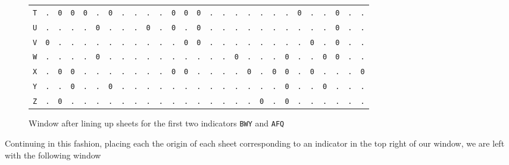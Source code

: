 \begin{figure}[H]
\begin{center}
{\begin{tabular}{c|cccccccccccccccccccccccccc}
				\texttt{T} & \texttt{.} & \texttt{0} & \texttt{0} & \texttt{0} & \texttt{.} & \texttt{0} & \texttt{.} & \texttt{.} & \texttt{.} & \texttt{.} & \texttt{0} & \texttt{0} & \texttt{0} & \texttt{.} & \texttt{.} & \texttt{.} & \texttt{.} & \texttt{.} & \texttt{.} & \texttt{.} & \texttt{0} & \texttt{.} & \texttt{.} & \texttt{0} & \texttt{.} & \texttt{.} \\
				\texttt{U} & \texttt{.} & \texttt{.} & \texttt{.} & \texttt{.} & \texttt{0} & \texttt{.} & \texttt{.} & \texttt{.} & \texttt{0} & \texttt{.} & \texttt{0} & \texttt{.} & \texttt{0} & \texttt{.} & \texttt{.} & \texttt{.} & \texttt{.} & \texttt{.} & \texttt{.} & \texttt{.} & \texttt{.} & \texttt{.} & \texttt{.} & \texttt{0} & \texttt{.} & \texttt{.} \\
				\texttt{V} & \texttt{0} & \texttt{.} & \texttt{.} & \texttt{.} & \texttt{.} & \texttt{.} & \texttt{.} & \texttt{.} & \texttt{.} & \texttt{.} & \texttt{.} & \texttt{0} & \texttt{0} & \texttt{.} & \texttt{.} & \texttt{.} & \texttt{.} & \texttt{.} & \texttt{.} & \texttt{.} & \texttt{.} & \texttt{0} & \texttt{.} & \texttt{0} & \texttt{.} & \texttt{.} \\
				\texttt{W} & \texttt{.} & \texttt{.} & \texttt{.} & \texttt{.} & \texttt{0} & \texttt{.} & \texttt{.} & \texttt{.} & \texttt{.} & \texttt{.} & \texttt{.} & \texttt{.} & \texttt{.} & \texttt{.} & \texttt{.} & \texttt{0} & \texttt{.} & \texttt{.} & \texttt{.} & \texttt{0} & \texttt{.} & \texttt{.} & \texttt{0} & \texttt{0} & \texttt{.} & \texttt{.} \\
				\texttt{X} & \texttt{.} & \texttt{0} & \texttt{0} & \texttt{.} & \texttt{.} & \texttt{.} & \texttt{.} & \texttt{.} & \texttt{.} & \texttt{.} & \texttt{0} & \texttt{0} & \texttt{.} & \texttt{.} & \texttt{.} & \texttt{.} & \texttt{0} & \texttt{.} & \texttt{0} & \texttt{0} & \texttt{.} & \texttt{0} & \texttt{.} & \texttt{.} & \texttt{.} & \texttt{0} \\
				\texttt{Y} & \texttt{.} & \texttt{.} & \texttt{0} & \texttt{.} & \texttt{.} & \texttt{0} & \texttt{.} & \texttt{.} & \texttt{.} & \texttt{.} & \texttt{.} & \texttt{.} & \texttt{.} & \texttt{.} & \texttt{.} & \texttt{.} & \texttt{.} & \texttt{.} & \texttt{.} & \texttt{0} & \texttt{.} & \texttt{.} & \texttt{0} & \texttt{.} & \texttt{.} & \texttt{.} \\
				\texttt{Z} & \texttt{.} & \texttt{0} & \texttt{.} & \texttt{.} & \texttt{.} & \texttt{.} & \texttt{.} & \texttt{.} & \texttt{.} & \texttt{.} & \texttt{.} & \texttt{.} & \texttt{.} & \texttt{.} & \texttt{.} & \texttt{.} & \texttt{.} & \texttt{0} & \texttt{.} & \texttt{0} & \texttt{.} & \texttt{.} & \texttt{.} & \texttt{.} & \texttt{.} & \texttt{.} \\
			\end{tabular}
		}
	\end{center}
	\caption{Window after lining up sheets for the first two indicators \texttt{BWY} and \texttt{AFQ}}
\end{figure}
\noindent Continuing in this fashion, placing each the origin of each sheet corresponding to an indicator in the top right of our window, we are left with the following window

